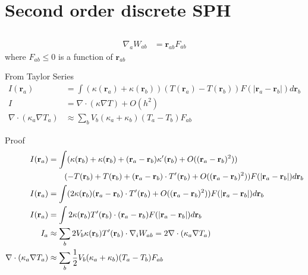 \documentclass{article}
\newcommand{\rr}{\mathbf{r}}
\begin{document}
\section{Second order discrete SPH}
\subsection{\cite{monaghan:2005:sph}}

\begin{align*}
  \nabla_a W_{ab} &= \rr_{ab} F_{ab}
\end{align*}
where $F_{ab} \le 0$ is a function of $\rr_{ab}$

From Taylor Series
\begin{align*}
  I(\rr_a) &= \int (\kappa(\rr_a) + \kappa(\rr_b)) (T(\rr_a) - T(\rr_b)) F(|\rr_a - \rr_b|) d\rr_b \\
  I &= \nabla \cdot ( \kappa \nabla T) + O(h^2) \\
  \nabla \cdot ( \kappa_a \nabla T_a) &\approx \sum_b V_b (\kappa_a + \kappa_b) ( T_a - T_b ) F_{ab} 
\end{align*}

Proof
\begin{align*}
  I(\rr_a) &= \int (\kappa(\rr_b) + \kappa(\rr_b) + (\rr_a-\rr_b) \kappa'(\rr_b) + O((\rr_a-\rr_b)^2) ) \notag \\
  & \qquad ( - T(\rr_b) + T(\rr_b) + (\rr_a-\rr_b) \cdot T'(\rr_b) + O((\rr_a-\rr_b)^2) )  F(|\rr_a - \rr_b|) d\rr_b  \\
  I(\rr_a) &= \int (  2 \kappa(\rr_b) (\rr_a -\rr_b) \cdot T'(\rr_b) + O((\rr_a - \rr_b)^2) ) F(|\rr_a - \rr_b|) d\rr_b \\
  I(\rr_a) &= \int 2 \kappa(\rr_b) T'(\rr_b) \cdot (\rr_a - \rr_b) F(|\rr_a - \rr_b|) d\rr_b \\
  I_a &\approx \sum_b 2 V_b \kappa(\rr_b)  T'(\rr_b) \cdot \nabla_i W_{ab} = 2 \nabla \cdot ( \kappa_a \nabla T_a ) \\
  \nabla \cdot ( \kappa_a \nabla T_a) &\approx \sum_b \frac{1}{2} V_b (\kappa_a + \kappa_b) ( T_a - T_b ) F_{ab} 
\end{align*}


\subsection{\cite{koschier:2020:sphreview}}
\end{document}

